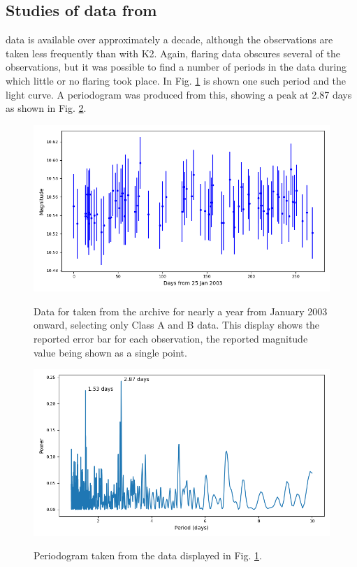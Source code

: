 \subsection{Studies of data from {\asas}}
\protect\label{section:asas}

{\asas} data is available over approximately a decade, although the observations
are taken less frequently than with K2. Again, flaring data obscures several of
the observations, but it was possible to find a number of periods in the data
during which little or no flaring took place. In Fig. \ref{fig:asaslcurve} is
shown one such period and the light curve. A periodogram was produced from this,
showing a peak at 2.87 days as shown in Fig. \ref{fig:asaspgram}.

\begin{figure}[!htbp]
\begin{center}
\includegraphics[scale=0.40]{asas/images/asaslcurve.png} \\
\vspace{-.5cm}
\end{center}   
\caption{Data for {\ross} taken from the {\asas} archive for nearly a year from
January 2003 onward, selecting only Class A and
B data. This display shows the reported error bar
for each observation, the reported magnitude
value being shown as a single point.}\protect\label{fig:asaslcurve}
\end{figure}

\begin{figure}[!htbp]
\begin{center}
\includegraphics[scale=0.40]{asas/images/asaspgram.png} \\
\vspace{-.5cm}
\end{center}   
\caption{Periodogram taken from the data displayed in Fig.
\ref{fig:asaslcurve}.}\protect\label{fig:asaspgram}
\end{figure}

